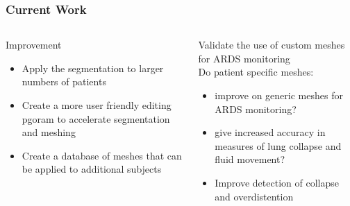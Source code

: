 \documentclass[10pt,    %
    english,            %
    xcolor=table,       %
    envcountsect,        %
    aspectratio=1610
]{beamer}
\begin{document}
\begin{frame}
\frametitle{Current Work}    
\begin{columns}[c]
\begin{column}{0.5\textwidth}
\alert{Improvement}
\begin{itemize}
\item Apply the segmentation to larger numbers of patients
\item Create a more user friendly editing pgoram to accelerate segmentation and meshing
\item Create a database of meshes that can be applied to additional subjects
\end{itemize}
\end{column}
\begin{column}{0.5\textwidth}
\alert{Validate the use of custom meshes for ARDS monitoring} \\
\vspace{1em}
Do patient specific meshes:
\begin{itemize}
\item improve on generic meshes for ARDS monitoring?
\item give increased accuracy in measures of lung collapse and fluid movement?
\item Improve detection of collapse and overdistention 
\end{itemize}
\end{column}
\end{columns}
\end{frame}


\begin{frame}
  \titlepage
\end{frame}

\end{document}
